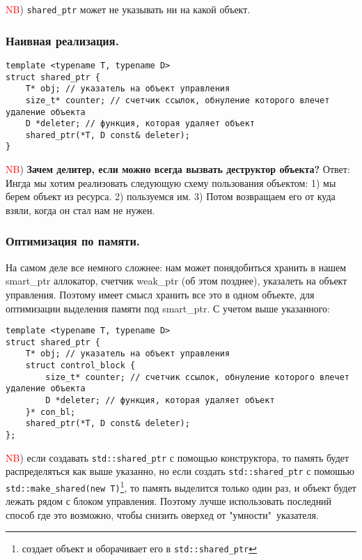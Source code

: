 \textcolor{red}{NB}) \texttt{shared_ptr} может не указывать ни на какой объект.

\subsubsection{Наивная реализация.}

\begin{verbatim}
template <typename T, typename D>
struct shared_ptr {
    T* obj; // указатель на объект управления
    size_t* counter; // счетчик ссылок, обнуление которого влечет удаление объекта
    D *deleter; // функция, которая удаляет объект
    shared_ptr(*T, D const& deleter);
}

\end{verbatim}



\textcolor{red}{NB}) \textbf{Зачем делитер, если можно всегда вызвать деструктор объекта?} Ответ: Ингда мы хотим реализовать следующую схему пользования объектом: 1) мы берем объект из ресурса. 2) пользуемся им. 3) Потом возвращаем его от куда взяли, когда он стал нам не нужен.

\subsubsection{Оптимизация по памяти.}
На самом деле все немного сложнее: нам может понядобиться хранить в нашем smart\_ptr аллокатор, счетчик weak\_ptr (об этом позднее), указалеть на объект управления. Поэтому имеет смысл хранить все это в одном объекте, для оптимизации выделения памяти под smart\_ptr. С учетом выше указанного:

\begin{verbatim}
template <typename T, typename D>
struct shared_ptr {
    T* obj; // указатель на объект управления
    struct control_block {
        size_t* counter; // счетчик ссылок, обнуление которого влечет удаление объекта
        D *deleter; // функция, которая удаляет объект
    }* con_bl;
    shared_ptr(*T, D const& deleter);
};

\end{verbatim}


\textcolor{red}{NB}) если создавать \texttt{std::shared_ptr} с помощью конструктора, то память будет распределяться как выше указанно, но если создать \texttt{std::shared_ptr} с помошью \texttt{std::make_shared(new T)}\footnote{создает объект и оборачивает его в \texttt{std::shared_ptr}}, то память выделится только один раз, и объект будет лежать рядом с блоком управления. Поэтому лучше использовать последний способ где это возможно, чтобы снизить оверхед от "умности"\ указателя.

